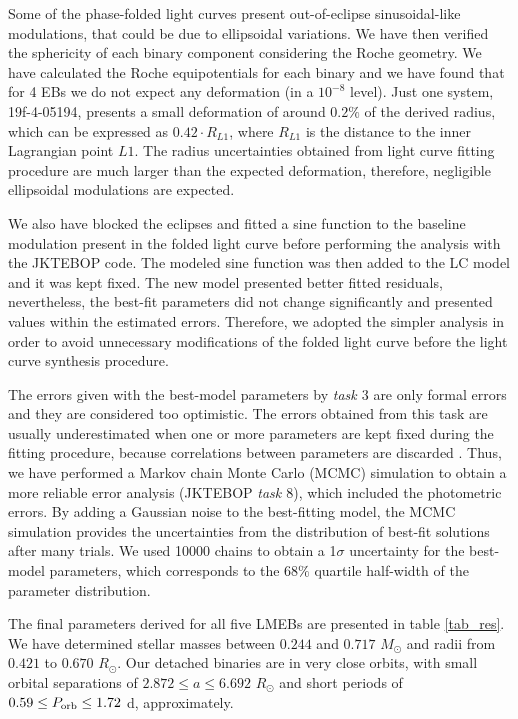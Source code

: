 \documentclass[fleqn,usenatbib]{mnras}
\begin{document}
Some of the phase-folded light curves present out-of-eclipse sinusoidal-like modulations, that could be due to ellipsoidal variations. We have then verified the sphericity of each binary component considering the Roche geometry. We have calculated the Roche equipotentials for each binary and we have found that for 4 EBs we do not expect any deformation (in a $10^{-8}$ level). Just one system, 19f-4-05194, presents a small deformation of around $0.2\%$ of the derived radius, which can be expressed as $0.42\cdot R_{L1}$, where $R_{L1}$ is the distance to the inner Lagrangian point $L1$. The radius uncertainties obtained from light curve fitting procedure are much larger than the expected deformation, therefore, negligible ellipsoidal modulations are expected.

We also have blocked the eclipses and fitted a sine function to the baseline modulation present in the folded light curve before performing the analysis with the JKTEBOP code. The modeled sine function was then added to the LC model and it was kept fixed. The new model presented better fitted residuals, nevertheless, the best-fit parameters did not change significantly and presented values within the estimated errors. Therefore, we adopted the simpler analysis in order to avoid unnecessary modifications of the folded light curve before the light curve synthesis procedure.

The errors given with the best-model parameters by {\it task $3$} are only formal errors and they are considered too optimistic. The errors obtained from this task are usually underestimated when one or more parameters are kept fixed during the fitting procedure, because correlations between parameters are discarded \citep{Torres00}. Thus, we have performed a Markov chain Monte Carlo (MCMC) simulation to obtain a more reliable error analysis (JKTEBOP {\it task $8$}), which included the photometric errors. By adding a Gaussian noise to the best-fitting model, the MCMC simulation provides the uncertainties from the distribution of best-fit solutions after many trials. We used 10000 chains to obtain a 1$\sigma$ uncertainty for the best-model parameters, which corresponds to the $68\%$ quartile half-width of the parameter distribution.

The final parameters derived for all five LMEBs are presented in table \ref{tab_res}. We have determined stellar masses between $0.244$ and $0.717$ $M_{\odot}$ and radii from $0.421$ to $0.670$ $R_{\odot}$. Our detached binaries are in very close orbits, with small orbital separations of $2.872 \leq a \leq 6.692$ $R_{\odot}$ and short periods of $0.59 \leq P_{\rm orb} \leq 1.72$ d, approximately.
\end{document}
